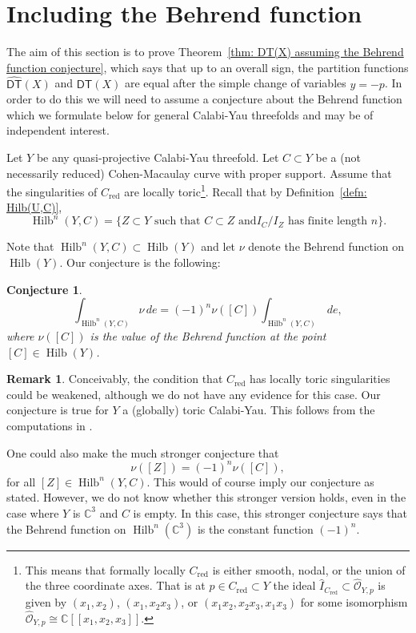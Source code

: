 \documentclass[12pt]{amsart}
\newtheorem{conjecture}[theorem]{Conjecture}
\theoremstyle{definition}
\newtheorem{remark}[theorem]{Remark}
\newcommand{\CC} {\mathbb{C}}          %
\newcommand{\Hilb}{\operatorname{Hilb}}
\newcommand{\DT}{\mathsf{DT}}
\newcommand{\DThat}{\widehat{\DT}}
\newcommand{\red}{\mathrm{red}}
\newcommand{\presectionspace}{\vspace{0.2cm}} %
\begin{document}
\presectionspace
\section{Including the Behrend function} \label{sec: Behrend}

The aim of this section is to prove Theorem~\ref{thm: DT(X) assuming
the Behrend function conjecture}, which says that up to an overall
sign, the partition functions $\DThat (X)$ and $\DT (X)$ are equal
after the simple change of variables $y=-p$. In order to do this we
will need to assume a conjecture about the Behrend function which we
formulate below for general Calabi-Yau threefolds and may be of
independent interest.

Let $Y$ be any quasi-projective Calabi-Yau
threefold.  Let $C\subset Y$ be a (not necessarily reduced)
Cohen-Macaulay curve with proper support. Assume that the
singularities of $C_{\red}$ are locally toric\footnote{This means that
formally locally $C_{\red}$ is either smooth, nodal, or the union of
the three coordinate axes. That is at $p\in C_{\red}\subset Y$ the
ideal $\widehat{I}_{C_{\red}}\subset \widehat{\mathcal{O}}_{Y,p}$ is
given by $(x_{1},x_{2})$, $(x_{1},x_{2}x_{3})$, or
$(x_{1}x_{2},x_{2}x_{3},x_{1}x_{3})$ for some isomorphism
$\widehat{\mathcal{O}}_{Y,p}\cong \CC
[[x_{1},x_{2},x_{3}]]$. }. Recall that by Definition~\ref{defn:
Hilb(U,C)}, 
\[
\Hilb^{n}(Y,C) = \{Z\subset Y \text{ such that $C\subset Z$ and
$I_{C}/I_{Z}$ has finite length $n$} \}.
\]

Note that $\Hilb^{n}(Y,C)\subset \Hilb (Y)$ and let $\nu$ denote the
Behrend function on $\Hilb (Y)$. Our conjecture is the following:

\begin{conjecture}\label{conj: Behrend fnc conj}
\[
\int_{\Hilb^{n}(Y,C)} \nu \, de = (-1)^{n} \nu ([C]) \int_{\Hilb^{n}(Y,C)} \, de,
\]
where $\nu ([C])$ is the value of the Behrend function at the point $[C]\in \Hilb (Y)$.
\end{conjecture}

\begin{remark}
Conceivably, the condition that $C_{\red}$ has locally toric
singularities could be weakened, although we do not have any evidence
for this case. Our conjecture is true for $Y$ a (globally) toric
Calabi-Yau. This follows from the computations in \cite{MNOP1}.

One could also make the much stronger conjecture that 
\[
\nu ([Z]) = (-1)^{n} \nu ([C]),
\]
for all $[Z]\in \Hilb^{n}(Y,C)$. This would of course imply our
conjecture as stated. However, we do not know whether this stronger version
holds, even in the case where $Y$ is $\CC^{3}$ and $C$ is empty. In
this case, this stronger conjecture says that the Behrend function
on $\Hilb^{n}(\CC^{3})$ is the constant function $(-1)^{n}$.
\end{remark}
\end{document}
